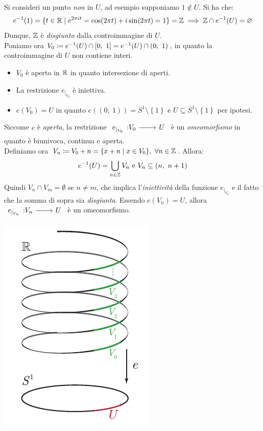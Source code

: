 \begin{demonstration}
	Si consideri un punto \textit{non} in $U$, ad esempio supponiamo $1\notin U$. Si ha che:
	\begin{equation*}
		e^{-1}(1)=\{t\in\mathbb{R} \mid e^{2\pi i t}=\cos(2\pi t)+i\sin(2\pi t)=1\}=\mathbb{Z} \implies \mathbb{Z} \cap e^{-1}(U)=\varnothing
	\end{equation*}
	Dunque, $\mathbb{Z}$ è \textit{disgiunto} dalla controimmagine di $U$.\\
	Poniamo ora $V_0\coloneqq e^{-1}(U)\cap \left[0,\ 1\right]= e^{-1}(U)\cap (0,\ 1)$, in quanto la controimmagine di $U$ non contiene interi.\\
		\begin{minipage}[t]{0.68\textwidth}
	\begin{itemize}
	\item $V_0$ è aperto in $\mathbb{R}$ in quanto intersezione di aperti.
	\item La restrizione $e_{\mid_{V_0}}$ è iniettiva.
	\item $e(V_0)=U$ in quanto $e\left( (0,\ 1) \right)=S^1\setminus\left\{1\right\}$ e $U\subseteq S^1\setminus\left\{1\right\}$ per ipotesi.
\end{itemize}
Siccome $e$ è \textit{aperta}, la restrizione $\funz {e_{\mid_{V_0}}} {V_0} U$ è un \textit{omeomorfismo} in quanto è biunivoca, continua e aperta.\\
Definiamo ora $V_n\coloneqq V_0 +n=\{ x+n \mid x\in V_0\},\ \forall n\in\mathbb{Z}$. Allora:
\begin{equation*}
	e^{-1}(U)=\bigcup_{n\in\mathbb{Z}} V_n\text{ e }V_n\subseteq (n,\ n+1)
\end{equation*}
Quindi $V_n\cap V_m=\emptyset$ se $n\neq m$, che implica l'\textit{iniettività} della funzione $e_{\mid_{V_n}}$ e il fatto che la somma di sopra sia \textit{disgiunta}. Essendo $e(V_n)=U$, allora $\funz  {e_{\mid_{V_n}}} {V_n} U$ è un omeomorfismo.
	\end{minipage}
	\begin{minipage}[t]{0.31\textwidth}\vspace{-10pt}
	\includegraphics[trim=0cm 0cm 0cm 0cm,clip,scale=1]{images/spiralexponential.pdf}
	\end{minipage}
\end{demonstration}

